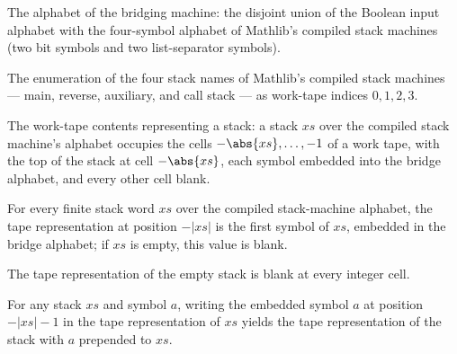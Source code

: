 \begin{definition}
\label{Turing.BridgeAlphabet}
\leanok
The alphabet of the bridging machine: the disjoint union of the Boolean input
alphabet with the four-symbol alphabet of Mathlib's compiled stack machines (two bit
symbols and two list-separator symbols).
\end{definition}

\begin{definition}
\label{Turing.bridgeIndex}
\leanok
The enumeration of the four stack names of Mathlib's compiled stack machines ---
main, reverse, auxiliary, and call stack --- as work-tape indices $0, 1, 2, 3$.
\end{definition}

\begin{definition}
\label{Turing.bridgeStack}
\leanok
{}
The work-tape contents representing a stack: a stack $xs$ over the compiled stack
machine's alphabet occupies the cells $-\abs{xs}, \dots, -1$ of a work tape, with
the top of the stack at cell $-\abs{xs}$, each symbol embedded into the bridge
alphabet, and every other cell blank.
\end{definition}

\begin{lemma}
\label{Turing.bridgeStack_read}
\leanok
{}
For every finite stack word $xs$ over the compiled stack-machine alphabet, the tape
representation at position $-|xs|$ is the first symbol of $xs$, embedded in the bridge
alphabet; if $xs$ is empty, this value is blank.
\end{lemma}

\begin{lemma}
\label{Turing.bridgeStack_nil}
\leanok
{}
The tape representation of the empty stack is blank at every integer cell.
\end{lemma}

\begin{lemma}
\label{Turing.bridgeStack_push}
\leanok
{}
For any stack $xs$ and symbol $a$, writing the embedded symbol $a$ at position $-|xs|-1$
in the tape representation of $xs$ yields the tape representation of the stack with $a$
prepended to $xs$.
\end{lemma}

